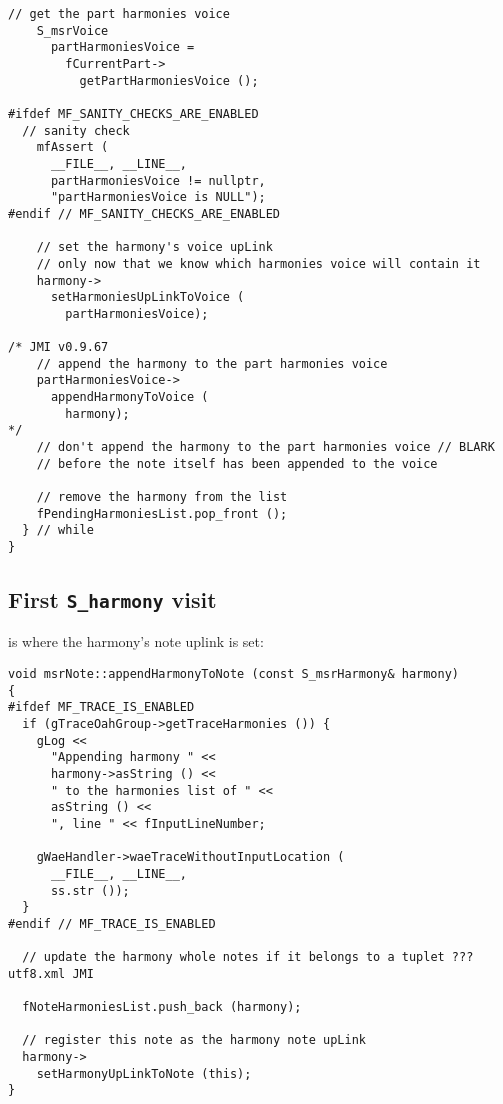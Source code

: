 \begin{lstlisting}[language=CPlusPlus]
    // get the part harmonies voice
    S_msrVoice
      partHarmoniesVoice =
        fCurrentPart->
          getPartHarmoniesVoice ();

#ifdef MF_SANITY_CHECKS_ARE_ENABLED
  // sanity check
    mfAssert (
      __FILE__, __LINE__,
      partHarmoniesVoice != nullptr,
      "partHarmoniesVoice is NULL");
#endif // MF_SANITY_CHECKS_ARE_ENABLED

    // set the harmony's voice upLink
    // only now that we know which harmonies voice will contain it
    harmony->
      setHarmoniesUpLinkToVoice (
        partHarmoniesVoice);

/* JMI v0.9.67
    // append the harmony to the part harmonies voice
    partHarmoniesVoice->
      appendHarmonyToVoice (
        harmony);
*/
    // don't append the harmony to the part harmonies voice // BLARK
    // before the note itself has been appended to the voice

    // remove the harmony from the list
    fPendingHarmoniesList.pop_front ();
  } // while
}
\end{lstlisting}


\subsection{First {\tt S_harmony} visit}

 is where the harmony's note uplink is set:
\begin{lstlisting}[language=CPlusPlus]
void msrNote::appendHarmonyToNote (const S_msrHarmony& harmony)
{
#ifdef MF_TRACE_IS_ENABLED
  if (gTraceOahGroup->getTraceHarmonies ()) {
    gLog <<
      "Appending harmony " <<
      harmony->asString () <<
      " to the harmonies list of " <<
      asString () <<
      ", line " << fInputLineNumber;

    gWaeHandler->waeTraceWithoutInputLocation (
      __FILE__, __LINE__,
      ss.str ());
  }
#endif // MF_TRACE_IS_ENABLED

  // update the harmony whole notes if it belongs to a tuplet ??? utf8.xml JMI

  fNoteHarmoniesList.push_back (harmony);

  // register this note as the harmony note upLink
  harmony->
    setHarmonyUpLinkToNote (this);
}
\end{lstlisting}

